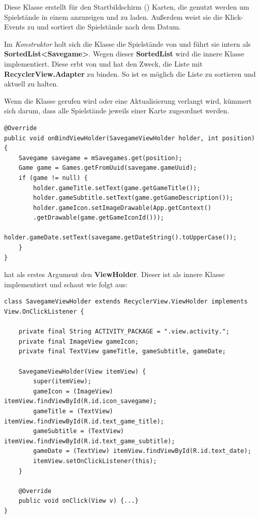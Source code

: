 Diese Klasse erstellt für den Startbildschirm () Karten, die
genutzt werden um Spielstände in einem  anzuzeigen und zu
laden. Außerdem weist sie die Klick-Events zu und sortiert die Spielstände nach
dem Datum.

Im \emph{Konstruktor} holt sich die Klasse die Spielstände von
 und führt sie intern als \textbf{SortedList<Savegame>}.
Wegen dieser \textbf{SortedList} wird die innere Klasse
 implementiert. Diese erbt von
 und hat den Zweck, die Liste mit
\textbf{RecyclerView.Adapter} zu binden. So ist es möglich die Liste zu
sortieren und aktuell zu halten.

Wenn die Klasse gerufen wird oder eine Aktualisierung verlangt wird, kümmert
sich  darum, dass alle
Spielstände jeweils einer Karte zugeordnet werden.

\begin{lstlisting}[caption={SavegameAdapter onBindViewHolder() Methode},captionpos=b]
@Override
public void onBindViewHolder(SavegameViewHolder holder, int position) {
	Savegame savegame = mSavegames.get(position);
	Game game = Games.getFromUuid(savegame.gameUuid);
	if (game != null) {
		holder.gameTitle.setText(game.getGameTitle());
		holder.gameSubtitle.setText(game.getGameDescription());
		holder.gameIcon.setImageDrawable(App.getContext()
		.getDrawable(game.getGameIconId()));
		holder.gameDate.setText(savegame.getDateString().toUpperCase());
	}
}
\end{lstlisting}

 hat als erstes Argument den \textbf{ViewHolder}.
Dieser ist als innere Klasse implementiert und schaut wie folgt aus:

\begin{lstlisting}[caption={SavegameAdapter SavegameViewHolder Klasse},captionpos=b]
class SavegameViewHolder extends RecyclerView.ViewHolder implements View.OnClickListener {

	private final String ACTIVITY_PACKAGE = ".view.activity.";
	private final ImageView gameIcon;
	private final TextView gameTitle, gameSubtitle, gameDate;

	SavegameViewHolder(View itemView) {
		super(itemView);
		gameIcon = (ImageView) itemView.findViewById(R.id.icon_savegame);
		gameTitle = (TextView) itemView.findViewById(R.id.text_game_title);
		gameSubtitle = (TextView) itemView.findViewById(R.id.text_game_subtitle);
		gameDate = (TextView) itemView.findViewById(R.id.text_date);
		itemView.setOnClickListener(this);
	}

	@Override
	public void onClick(View v) {...}
}
\end{lstlisting}

